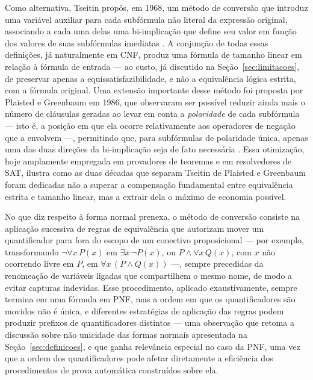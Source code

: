 \documentclass[12pt,a4paper,oneside]{report}
\theoremstyle{tituloplain}
\theoremstyle{titulodef}
\begin{document}
Como alternativa, Tseitin propôs, em 1968, um método de conversão que introduz uma variável auxiliar para cada subfórmula não literal da expressão original, associando a cada uma delas uma bi-implicação que define seu valor em função dos valores de suas subfórmulas imediatas \cite{tseitin1968}. A conjunção de todas essas definições, já naturalmente em CNF, produz uma fórmula de tamanho linear em relação à fórmula de entrada — ao custo, já discutido na Seção~\ref{sec:limitacoes}, de preservar apenas a equissatisfazibilidade, e não a equivalência lógica estrita, com a fórmula original. Uma extensão importante desse método foi proposta por Plaisted e Greenbaum em 1986, que observaram ser possível reduzir ainda mais o número de cláusulas geradas ao levar em conta a \textit{polaridade} de cada subfórmula — isto é, a posição em que ela ocorre relativamente aos operadores de negação que a envolvem —, permitindo que, para subfórmulas de polaridade única, apenas uma das duas direções da bi-implicação seja de fato necessária \cite{plaisted1986}. Essa otimização, hoje amplamente empregada em provadores de teoremas e em resolvedores de SAT, ilustra como as duas décadas que separam Tseitin de Plaisted e Greenbaum foram dedicadas não a superar a compensação fundamental entre equivalência estrita e tamanho linear, mas a extrair dela o máximo de economia possível.
 
No que diz respeito à forma normal prenexa, o método de conversão consiste na aplicação sucessiva de regras de equivalência que autorizam mover um quantificador para fora do escopo de um conectivo proposicional — por exemplo, transformando $\neg \forall x\, P(x)$ em $\exists x\, \neg P(x)$, ou $P \wedge \forall x\, Q(x)$, com $x$ não ocorrendo livre em $P$, em $\forall x\, (P \wedge Q(x))$ —, sempre precedidas da renomeação de variáveis ligadas que compartilhem o mesmo nome, de modo a evitar capturas indevidas. Esse procedimento, aplicado exaustivamente, sempre termina em uma fórmula em PNF, mas a ordem em que os quantificadores são movidos não é única, e diferentes estratégias de aplicação das regras podem produzir prefixos de quantificadores distintos — uma observação que retoma a discussão sobre não unicidade das formas normais apresentada na Seção~\ref{sec:definicoes}, e que ganha relevância especial no caso da PNF, uma vez que a ordem dos quantificadores pode afetar diretamente a eficiência dos procedimentos de prova automática construídos sobre ela.
 
\end{document}
